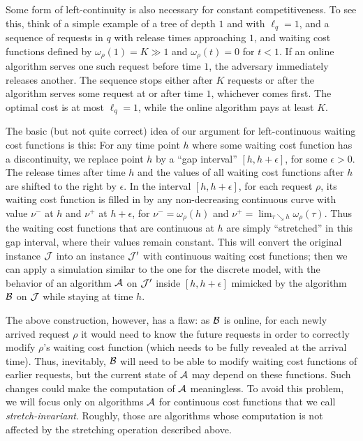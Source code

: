 \documentclass[a4paper]{article}
\newcommand{\calA}{{\cal A}}
\newcommand{\calB}{{\cal B}}
\newcommand{\calJ}{{\cal J}}
\newcommand{\length}{\ell}
\begin{document}
Some form of left-continuity is also necessary for constant
competitiveness.  To see this, think of a simple example of a tree of
depth $1$ and with $\length_q = 1$, and a sequence of requests in $q$ with release times
approaching $1$, and waiting cost functions defined by
$\omega_\rho(1)=K\gg 1$ and $\omega_\rho(t)=0$ for $t<1$. If
an online algorithm serves one such request before time $1$, the
adversary immediately releases another. The sequence stops either
after $K$ requests or after the algorithm serves some
request at or after time $1$, whichever comes first. 
The optimal cost is at most $\length_q=1$,
while the online algorithm pays at least $K$.

The basic (but not quite correct) idea of our argument for left-continuous waiting
cost functions is this:
For any time point $h$ where some waiting cost function has a discontinuity,
we replace point $h$ by a ``gap interval'' $[h,h+\epsilon]$, for some $\epsilon > 0$. 
The release times after time $h$ and the values of all
waiting cost functions after $h$ are shifted to the right by $\epsilon$.
In the interval $[h,h+\epsilon]$, for each request $\rho$, its waiting
cost function is filled in by any non-decreasing continuous curve with value
$\nu^-$ at $h$ and $\nu^+$ at $h+\epsilon$, for $\nu^- = \omega_\rho(h)$
and $\nu^+ = \lim_{\tau\searrow h} \omega_\rho(\tau)$.
Thus the waiting cost functions that are continuous at $h$ are simply
``stretched'' in this gap interval, where their values remain constant.
This will convert the original instance $\calJ$ into an instance
$\calJ'$ with continuous waiting cost functions; then we can apply
a simulation similar to the one for the discrete model, with the
behavior of an algorithm $\calA$ on $\calJ'$ inside $[h,h+\epsilon]$ mimicked
by the algorithm $\calB$ on $\calJ$ while staying at time $h$.

The above construction, however, has a flaw: as $\calB$ is online, for each
newly arrived request $\rho$ it would need to know the future requests
in order to correctly modify $\rho$'s waiting cost function (which needs
to be fully revealed at the arrival time). Thus, inevitably, $\calB$ will
need to be able to modify waiting cost functions of earlier
requests, but the current state of $\calA$ may depend on these functions.
Such changes could make the computation of $\calA$ meaningless. 
To avoid this problem, we
will focus only on algorithms $\calA$ for continuous cost functions that
we call \emph{stretch-invariant}. Roughly, those are algorithms whose
computation is not affected by the stretching operation described above.
\end{document}
